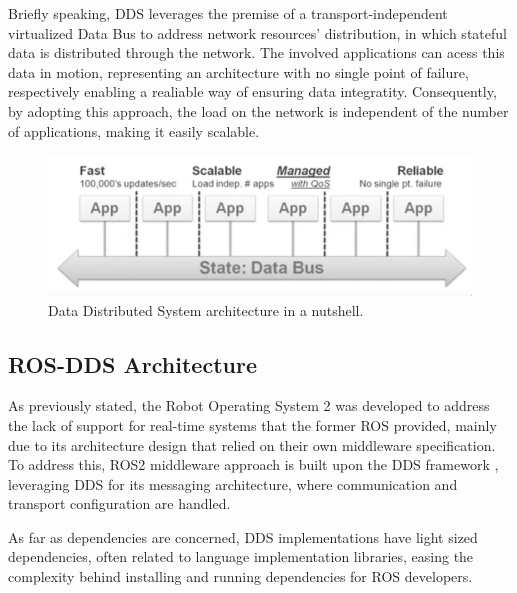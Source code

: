 Briefly speaking, DDS leverages the premise of a transport-independent virtualized Data Bus to address network resources' distribution, in which stateful data is distributed through the network. The involved applications can acess this data in motion, representing an architecture with no single point of failure, respectively enabling a realiable way of ensuring data integratity. Consequently, by adopting this approach, the load on the network is independent of the number of applications, making it easily scalable. %

\begin{figure}[H]
    \centering
    \includegraphics[width=0.5\linewidth]{images/dds-architecture.png}
    \caption{Data Distributed System architecture in a nutshell.}
    \label{fig:dds-architecture-nutshell}
\end{figure}


\subsection{ROS-DDS Architecture}

As previously stated, the Robot Operating System 2 was developed to address the lack of support for real-time systems that the former ROS provided, mainly due to its architecture design that relied on their own middleware specification. To address this, ROS2 middleware approach is built upon the DDS framework \cite{maruyama2016exploring}, leveraging DDS for its messaging architecture, where communication and transport configuration are handled. %

As far as dependencies are concerned, DDS implementations have light sized dependencies, often related to language implementation libraries, easing the complexity behind installing and running dependencies for ROS developers. \cite{ros-on-dds}

